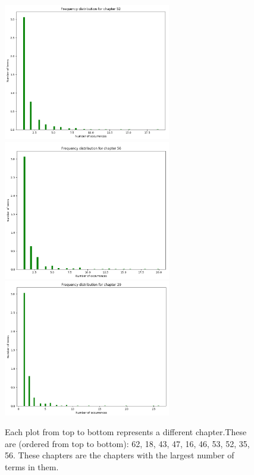 \documentclass{article}
\begin{document}
\begin{flushleft}
\begin{figure}[H]
\begin{minipage}{0.42\linewidth}
\includegraphics[width=0.65\textwidth]{./images/8-chapter_wise-frequency.png}
\includegraphics[width=0.65\textwidth]{./images/9-chapter_wise-frequency.png}
\includegraphics[width=0.65\textwidth]{./images/10-chapter_wise-frequency.png}
\end{minipage}
\caption{Each plot from top to bottom represents a different chapter.\newline{}These are (ordered from top to bottom): 62, 18, 43, 47, 16, 46, 53, 52, 35, 56. These chapters are the chapters with the largest number of terms in them.}
\end{figure}
\end{flushleft}
\end{document}
